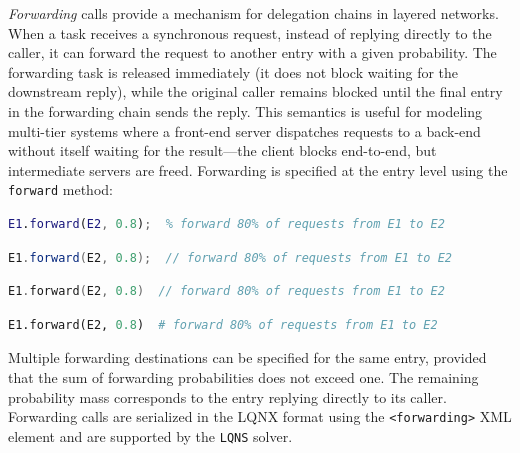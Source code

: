 \emph{Forwarding} calls provide a mechanism for delegation chains in layered networks. When a task receives a synchronous request, instead of replying directly to the caller, it can forward the request to another entry with a given probability. The forwarding task is released immediately (it does not block waiting for the downstream reply), while the original caller remains blocked until the final entry in the forwarding chain sends the reply. This semantics is useful for modeling multi-tier systems where a front-end server dispatches requests to a back-end without itself waiting for the result---the client blocks end-to-end, but intermediate servers are freed. Forwarding is specified at the entry level using the \texttt{forward} method:
\begin{MATLAB}
\begin{lstlisting}[language = matlab]
E1.forward(E2, 0.8);  % forward 80% of requests from E1 to E2
\end{lstlisting}
\end{MATLAB}
\begin{JAVA}
\begin{lstlisting}[language=java, basicstyle=\ttfamily\scriptsize]
E1.forward(E2, 0.8);  // forward 80% of requests from E1 to E2
\end{lstlisting}
\end{JAVA}
\begin{KOTLIN}
\begin{lstlisting}[language=kotlin, basicstyle=\ttfamily\scriptsize]
E1.forward(E2, 0.8)  // forward 80% of requests from E1 to E2
\end{lstlisting}
\end{KOTLIN}
\begin{PYTHON}
\begin{lstlisting}[language=python]
E1.forward(E2, 0.8)  # forward 80% of requests from E1 to E2
\end{lstlisting}
\end{PYTHON}
Multiple forwarding destinations can be specified for the same entry, provided that the sum of forwarding probabilities does not exceed one. The remaining probability mass corresponds to the entry replying directly to its caller. Forwarding calls are serialized in the LQNX format using the \texttt{<forwarding>} XML element and are supported by the \texttt{LQNS} solver.


